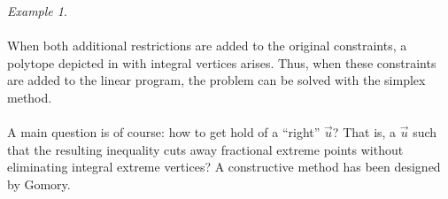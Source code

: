 \documentclass[titlepage]{book}
\theoremstyle{plain}
\theoremstyle{definition}
\theoremstyle{remark}
\newtheorem{example}{Example}
\begin{document}
\begin{example}
\paragraph{}
When both additional restrictions are added to the original constraints, a polytope depicted in  with integral vertices arises. Thus, when these constraints are added to the linear program, the problem can be solved with the simplex method.

\end{example}

\paragraph{}
A main question is of course: how to get hold of a ``right'' $\vec{u}$? That is, a $\vec{u}$ such that the resulting inequality cuts away fractional extreme points without eliminating integral extreme vertices? A constructive method has been designed by Gomory.
\end{document}
